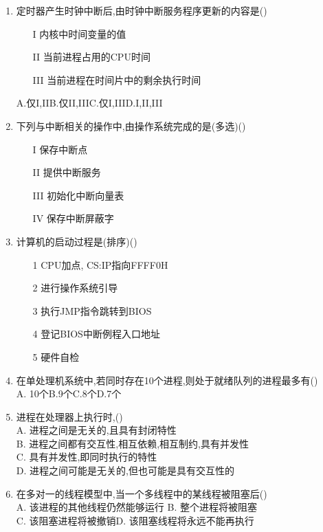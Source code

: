 \documentclass[12pt, a4paper, oneside, UTF8]{ctexbook}
\begin{document}
\begin{enumerate}
    \item \bt 定时器产生时钟中断后,由时钟中断服务程序更新的内容是()
    \begin{enumerate}
        \item [I] 内核中时间变量的值
        \item [II] 当前进程占用的CPU时间
        \item [III] 当前进程在时间片中的剩余执行时间
    \end{enumerate}
    A.仅I,II\qquad B.仅II,III\qquad C.仅I,III\qquad D.I,II,III

    \item \bt\bl 下列与中断相关的操作中,由操作系统完成的是(多选)()  
    \begin{enumerate}
        \item [I] 保存中断点
        \item [II] 提供中断服务
        \item [III] 初始化中断向量表
        \item [IV] 保存中断屏蔽字
    \end{enumerate}

    \item \bl 计算机的启动过程是(排序)() 
    \begin{enumerate}
        \item [1] CPU加点, CS:IP指向FFFF0H
        \item [2] 进行操作系统引导
        \item [3] 执行JMP指令跳转到BIOS
        \item [4] 登记BIOS中断例程入口地址
        \item [5] 硬件自检
    \end{enumerate}

    \item 在单处理机系统中,若同时存在10个进程,则处于就绪队列的进程最多有() \\
    A. 10个\qquad B.9个\qquad C.8个\qquad D.7个 

    \item 进程在处理器上执行时,() \\
    A. 进程之间是无关的,且具有封闭特性 \\
    B. 进程之间都有交互性,相互依赖,相互制约,具有并发性 \\
    C. 具有并发性,即同时执行的特性 \\
    D. 进程之间可能是无关的,但也可能是具有交互性的

    \item 在多对一的线程模型中,当一个多线程中的某线程被阻塞后() \\
    A. 该进程的其他线程仍然能够运行 \qquad B. 整个进程将被阻塞 \\
    C. 该阻塞进程将被撤销\qquad D. 该阻塞线程将永远不能再执行 


\end{enumerate}
\end{document}

